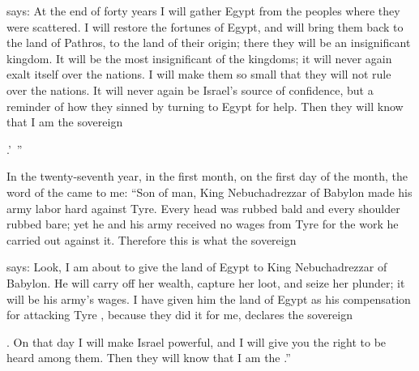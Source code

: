 {{}
says: At the end
of forty
years
I will gather
Egypt
from
the peoples
where
they were scattered.
I will restore
the fortunes
of Egypt,
and will bring them back
to the land
of Pathros,
to the land
of their origin;
there
they will be
an insignificant
kingdom.
It will be
the most insignificant
of the kingdoms;
it will never
again
exalt
itself over
the nations.
I will make them so small
that they will not
rule
over the nations.
It will
never
again
be Israel’s
source
of confidence,
but a reminder
of how
they sinned
by turning
to Egypt for help. Then
they will know
that
I am
the sovereign

{}.’ ”
\par }{\PP {}In the twenty-seventh
year,
in the first
month, on the first
day of the month,
the word
of the {}
came to me:
“Son
of man,
King
Nebuchadrezzar
of Babylon
made
his army
labor
hard
against
Tyre.
Every
head
was rubbed bald
and every
shoulder
rubbed
bare; yet he and his army
received
no
wages
from Tyre
for
the work
he carried out
against it.
Therefore
this is what
the sovereign

{}
says: Look,
I am about to give
the land
of Egypt
to King
Nebuchadrezzar
of Babylon.
He will carry off
her wealth,
capture
her loot,
and seize
her plunder;
it will be
his army’s
wages.
I have
given
him the land
of Egypt
as
his compensation
for attacking Tyre , because they did
it for me, declares
the sovereign

{}.
On that day
I will make
Israel
powerful, and I will give
you the right to be heard
among
them. Then they will know
that
I am
the {}.”

\par }
